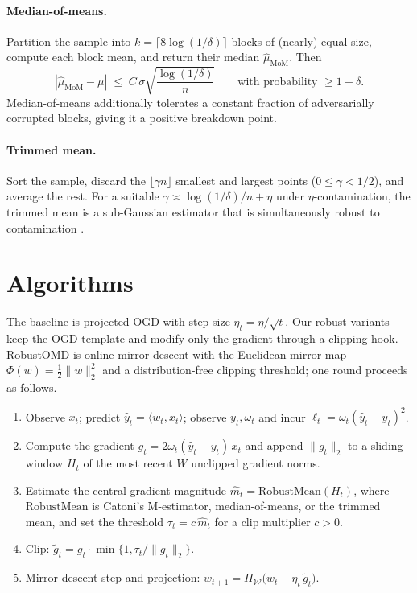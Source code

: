 \documentclass[11pt]{article}
\newcommand{\ip}[2]{\langle #1, #2 \rangle}
\newcommand{\norm}[1]{\lVert #1 \rVert}
\begin{document}
\paragraph{Median-of-means.} Partition the sample into
$k = \lceil 8 \log(1/\delta) \rceil$ blocks of (nearly) equal size, compute each block
mean, and return their median $\hat{\mu}_{\mathrm{MoM}}$. Then
\citep{nemirovski1983problem,devroye2016sub,lugosi2019mean}
\begin{equation}
|\hat{\mu}_{\mathrm{MoM}} - \mu| \;\le\; C \, \sigma \sqrt{\frac{\log(1/\delta)}{n}}
\qquad \text{with probability } \ge 1 - \delta .
\end{equation}
Median-of-means additionally tolerates a constant fraction of adversarially corrupted
blocks, giving it a positive breakdown point.

\paragraph{Trimmed mean.} Sort the sample, discard the $\lfloor \gamma n \rfloor$
smallest and largest points ($0 \le \gamma < 1/2$), and average the rest. For a suitable
$\gamma \asymp \log(1/\delta)/n + \eta$ under $\eta$-contamination, the trimmed mean is a
sub-Gaussian estimator that is simultaneously robust to contamination
\citep{lugosi2019mean,devroye2016sub}.

\section{Algorithms}

The baseline is projected OGD \citep{zinkevich2003online} with step size
$\eta_t = \eta / \sqrt{t}$. Our robust variants keep the OGD template and modify only
the gradient through a clipping hook. RobustOMD is online mirror descent with the
Euclidean mirror map $\Phi(w) = \tfrac{1}{2}\norm{w}_2^2$ and a distribution-free
clipping threshold; one round proceeds as follows.

\begin{enumerate}
  \item Observe $x_t$; predict $\hat{y}_t = \ip{w_t}{x_t}$; observe $y_t, \omega_t$ and
        incur $\ell_t = \omega_t (\hat{y}_t - y_t)^2$.
  \item Compute the gradient $g_t = 2 \omega_t (\hat{y}_t - y_t) \, x_t$ and append
        $\norm{g_t}_2$ to a sliding window $H_t$ of the most recent $W$ unclipped
        gradient norms.
  \item Estimate the central gradient magnitude
        $\hat{m}_t = \mathrm{RobustMean}(H_t)$, where $\mathrm{RobustMean}$ is Catoni's
        M-estimator, median-of-means, or the trimmed mean, and set the threshold
        $\tau_t = c \, \hat{m}_t$ for a clip multiplier $c > 0$.
  \item Clip: $\tilde{g}_t = g_t \cdot \min\{1, \tau_t / \norm{g_t}_2\}$.
  \item Mirror-descent step and projection:
        $w_{t+1} = \Pi_{\mathcal{W}} \bigl( w_t - \eta_t \, \tilde{g}_t \bigr)$.
\end{enumerate}
\end{document}
